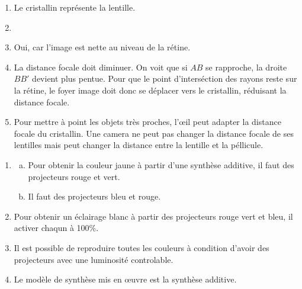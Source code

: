 \documentclass[12pt, a4paper]{article}
\begin{document}
    \begin{Exercise}[number={18}]
        \begin{enumerate}[1.]
            \item	Le cristallin représente la lentille.
            \item   \parbox[t][][c]{\linewidth}{\centering{}} \medbreak
                    \parbox{\linewidth}{}
            \item   Oui, car l'image est nette au niveau de la rétine.
            \item   La distance focale doit diminuer. On voit que si $AB$ se rapproche, la droite $BB'$ devient plus pentue. Pour que le point d'interséction des rayons reste sur la rétine, le foyer image doit donc se déplacer vers le cristallin, réduisant la distance focale.
            \item   Pour mettre à point les objets très proches, l'œil peut adapter la distance focale du cristallin. Une camera ne peut pas changer la distance focale de ses lentilles mais peut changer la distance entre la lentille et la péllicule.
        \end{enumerate}
    \end{Exercise}

    \begin{Exercise}[number={19}]
        \begin{enumerate}[1.]
            \item   \begin{enumerate}[a.]
                        \item	Pour obtenir la couleur jaune à partir d'une synthèse additive, il faut des projecteurs rouge et vert.
                        \item   Il faut des projecteurs bleu et rouge.
                    \end{enumerate}	
            \item   Pour obtenir un éclairage blanc à partir des projecteurs rouge vert et bleu, il activer chaqun à 100\%.
            \item   Il est possible de reproduire toutes les couleurs à condition d'avoir des projecteurs avec une luminosité controlable.
            \item   Le modèle de synthèse mis en œuvre est la synthèse additive.
        \end{enumerate}
    \end{Exercise}
\end{document}
